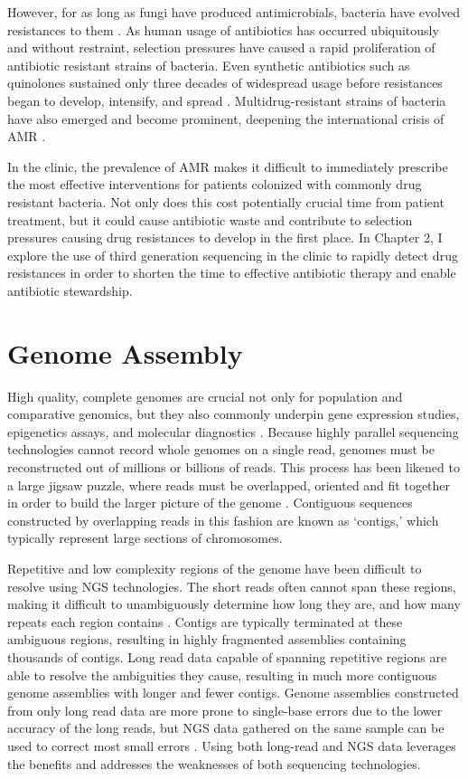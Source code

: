 However, for as long as fungi have produced antimicrobials, bacteria have evolved resistances to them \citep{DCosta2011-yn}. As human usage of antibiotics has occurred ubiquitously and without restraint, selection pressures have caused a rapid proliferation of antibiotic resistant strains of bacteria. Even synthetic antibiotics such as quinolones sustained only three decades of widespread usage before resistances began to develop, intensify, and spread \citep{Laxminarayan2013-dk, Ruiz2012-cx}. Multidrug-resistant strains of bacteria have also emerged and become prominent, deepening the international crisis of AMR \citep{Tamma2014-dh}.

In the clinic, the prevalence of AMR makes it difficult to immediately prescribe the most effective interventions for patients colonized with commonly drug resistant bacteria. Not only does this cost potentially crucial time from patient treatment, but it could cause antibiotic waste and contribute to selection pressures causing drug resistances to develop in the first place. In Chapter 2, I explore the use of third generation sequencing in the clinic to rapidly detect drug resistances in order to shorten the time to effective antibiotic therapy and enable antibiotic stewardship.

\section{Genome Assembly}
\label{sec:asm}
High quality, complete genomes are crucial not only for population and comparative genomics, but they also commonly underpin gene expression studies, epigenetics assays, and molecular diagnostics \citep{Rhie2021-xb}. Because highly parallel sequencing technologies cannot record whole genomes on a single read, genomes must be reconstructed out of millions or billions of reads. This process has been likened to a large jigsaw puzzle, where reads must be overlapped, oriented and fit together in order to build the larger picture of the genome \citep{Sohn2018-lf}. Contiguous sequences constructed by overlapping reads in this fashion are known as ‘contigs,’ which typically represent large sections of chromosomes.

Repetitive and low complexity regions of the genome have been difficult to resolve using NGS technologies. The short reads often cannot span these regions, making it difficult to unambiguously determine how long they are, and how many repeats each region contains \citep{Paszkiewicz2010-yf}. Contigs are typically terminated at these ambiguous regions, resulting in highly fragmented assemblies containing thousands of contigs. Long read data capable of spanning repetitive regions are able to resolve the ambiguities they cause, resulting in much more contiguous genome assemblies with longer and fewer contigs. Genome assemblies constructed from only long read data are more prone to single-base errors due to the lower accuracy of the long reads, but NGS data gathered on the same sample can be used to correct most small errors \citep{Goodwin2015-qs}. Using both long-read and NGS data leverages the benefits and addresses the weaknesses of both sequencing technologies.

